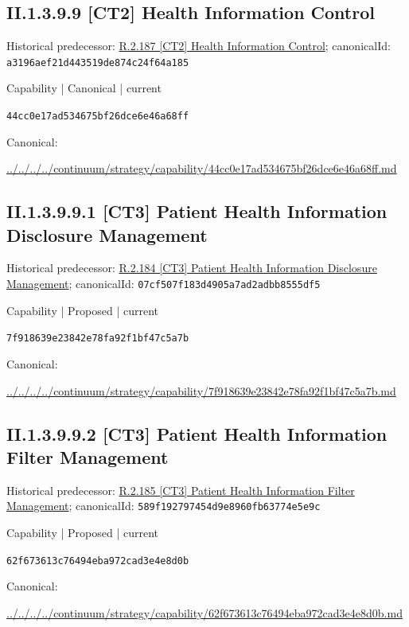 \documentclass[10pt,a4paper]{article}
\begin{document}
\subsection*{II.1.3.9.9 [CT2] Health Information Control}
Historical predecessor: \hyperref[element-a3196aef21d443519de874c24f64a185]{R.2.187 [CT2] Health Information Control}; canonicalId: \texttt{a3196aef21d443519de874c24f64a185}\par
\label{element-44cc0e17ad534675bf26dce6e46a68ff}
{\small Capability | Canonical | current}\par
\texttt{44cc0e17ad534675bf26dce6e46a68ff}\par
Canonical: \par
{\footnotesize\url{../../../../continuum/strategy/capability/44cc0e17ad534675bf26dce6e46a68ff.md}}\par
\subsection*{II.1.3.9.9.1 [CT3] Patient Health Information Disclosure Management}
Historical predecessor: \hyperref[element-07cf507f183d4905a7ad2adbb8555df5]{R.2.184 [CT3] Patient Health Information Disclosure Management}; canonicalId: \texttt{07cf507f183d4905a7ad2adbb8555df5}\par
\label{element-7f918639e23842e78fa92f1bf47c5a7b}
{\small Capability | Proposed | current}\par
\texttt{7f918639e23842e78fa92f1bf47c5a7b}\par
Canonical: \par
{\footnotesize\url{../../../../continuum/strategy/capability/7f918639e23842e78fa92f1bf47c5a7b.md}}\par
\subsection*{II.1.3.9.9.2 [CT3] Patient Health Information Filter Management}
Historical predecessor: \hyperref[element-589f192797454d9e8960fb63774e5e9c]{R.2.185 [CT3] Patient Health Information Filter Management}; canonicalId: \texttt{589f192797454d9e8960fb63774e5e9c}\par
\label{element-62f673613c76494eba972cad3e4e8d0b}
{\small Capability | Proposed | current}\par
\texttt{62f673613c76494eba972cad3e4e8d0b}\par
Canonical: \par
{\footnotesize\url{../../../../continuum/strategy/capability/62f673613c76494eba972cad3e4e8d0b.md}}\par
\end{document}
